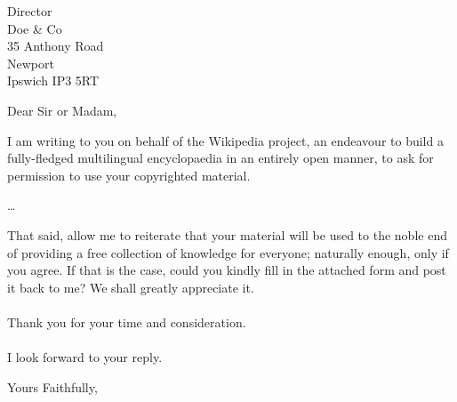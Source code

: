\documentclass[a4paper]{scrlttr2}
\begin{document}
\begin{letter}{Director \\ Doe \& Co \\ 35 Anthony Road
\\ Newport \\ Ipswich IP3 5RT}


\opening{Dear Sir or Madam,}

I am writing to you on behalf of the Wikipedia project, an endeavour to build a
fully-fledged multilingual encyclopaedia in an entirely open
manner, to ask for permission to use your copyrighted material.

\ldots 
 
That said, allow me to reiterate that your material will be used
to the noble end of providing a free collection of knowledge for
everyone; naturally enough, only if you agree. If that is the
case, could you kindly fill in the attached form and post it back
to me? We shall greatly appreciate it. \\
\\
Thank you for your time and consideration. \\
\\
I look forward to your reply. \\

\closing{Yours Faithfully,}

\end{letter}
\end{document}
